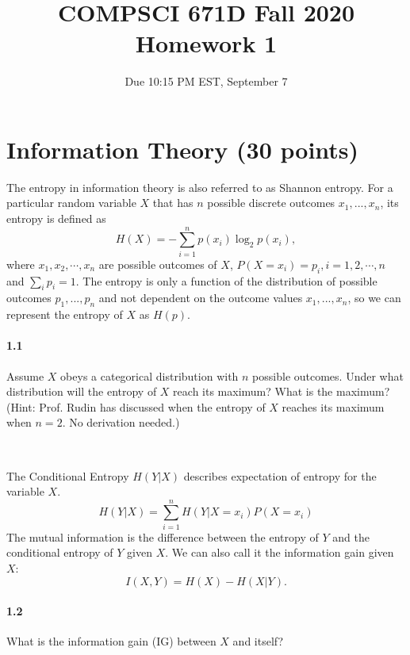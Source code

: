 \documentclass[11pt]{article}
\title{COMPSCI 671D Fall 2020\\Homework 1}
\author{}
\date{Due 10:15 PM EST, September 7}
\begin{document}
\maketitle


\section{Information Theory (30 points)}
\label{sec:it}
    The entropy in information theory is also referred to as Shannon entropy. For a particular random variable $X$ that has $n$ possible discrete outcomes $x_1,...,x_n$, its entropy is defined as 
    \begin{equation}
        H(X) = -\sum_{i=1}^n p(x_i) \log_2 p(x_i),
    \end{equation}
    where $x_1, x_2, \cdots, x_n$ are possible outcomes of $X$, $P(X=x_i) = p_i, i = 1,2,\cdots, n$ and $\sum_i p_i = 1$. The entropy is only a function of the distribution of possible outcomes $p_1,...,p_n$ and not dependent on the outcome values $x_1,...,x_n$, so we can represent the entropy of $X$ as $H(p)$. 
    


\paragraph{1.1} Assume $X$ obeys a categorical distribution with $n$ possible outcomes. Under what distribution will the entropy of $X$ reach its maximum? What is the maximum? (Hint: Prof. Rudin has discussed when the entropy of $X$ reaches its maximum when $n=2$. No derivation needed.)

\,

\noindent The Conditional Entropy $H(Y|X)$ describes expectation of entropy for the variable $X$.
\begin{equation}
\label{eq:conditional_entropy}
    H(Y|X) = \sum_{i=1}^n H(Y|X=x_i)P(X=x_i)
\end{equation}
The mutual information is the difference between the entropy of $Y$ and the conditional entropy of $Y$ given $X$. We can also call it the information gain given $X$:
\begin{equation}
\label{eq:information_gain}
    I(X,Y) = H(X) - H(X|Y).
\end{equation}



\paragraph{1.2} What is the information gain (IG) between $X$ and itself? 
\end{document}
